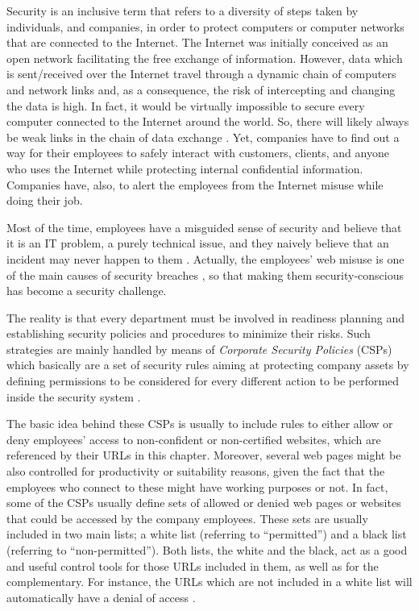 \documentclass{llncs}
\begin{document}
\noindent Security is an inclusive term that refers to a diversity of steps taken by individuals,
and companies, in order to protect computers or computer networks that are connected to the Internet.
The Internet was initially conceived as an open network facilitating the free exchange of information.
However, data which is sent/received over the Internet travel through a dynamic chain of computers and
network links and, as a consequence, the risk of intercepting and changing the data is high.
In fact, it would be virtually impossible to secure every computer connected to the Internet around the world.
So, there will likely always be weak links in the chain of data exchange \cite{cheswick2003firewalls}.
Yet, companies have to find out a way for their employees to safely interact with customers, clients, and anyone
who uses the Internet while protecting internal confidential information. Companies have, also, to alert the employees
from the Internet misuse while doing their job.

Most of the time, employees have a misguided sense of security and believe that it is an IT problem, a purely technical
issue, and they naively believe that an incident may never happen to them \cite{stanton2005analysis}.
Actually, the employees' web misuse is one of the main causes of  security breaches \cite{breivik2002abstract},
so that making them security-conscious has become a security  challenge.

The reality is that every department must be involved in  readiness planning and establishing security policies
and procedures  to minimize their risks. Such strategies are mainly handled by
means  of \textit{Corporate Security Policies} (CSPs) which basically are a  set of security rules aiming at
protecting company assets by defining  permissions to be considered for every different action to be  performed
inside the security system \cite{kaeo2003designing}.

The basic idea behind these CSPs is usually to include rules to either allow or deny employees' access to
non-confident or non-certified websites, which are referenced by their URLs in this chapter. Moreover, several web pages
might be also controlled for productivity  or suitability reasons, given the fact that the employees who connect
to these might have working purposes or not. In fact, some of the  CSPs usually define sets of allowed or denied
web pages or websites that could be accessed by the company employees. These sets are  usually included in two main
lists; a white list (referring to  ``permitted'') and a black list (referring to  ``non-permitted'').
Both lists, the white and the black, act as a  good and useful control tools for those URLs included in them,
as  well as for the complementary. For instance, the URLs which are not included in a white list will automatically
have a denial of  access \cite{ludl2007effectiveness}.
\end{document}
